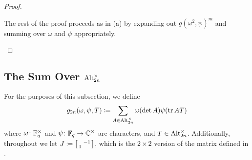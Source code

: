 \begin{proof}
\begin{enumerate}[label=(\alph*)]
        The rest of the proof proceeds as in (a) by expanding out $g\left(\omega^2,\psi\right)^m$ and summing over $\omega$ and $\psi$ appropriately.
        \qedhere
    \end{enumerate}
\end{proof}

\subsection{The Sum Over \texorpdfstring{$\operatorname{Alt}_{2n}^\times$}{ Alt}}
For the purposes of this subsection, we define
\[g_{2n}(\omega,\psi,T)\coloneqq\sum_{A\in\operatorname{Alt}_{2n}^\times}\omega(\det A)\psi(\operatorname{tr} AT)\]
where $\omega\colon\mathbb F_q^\times$ and $\psi\colon\mathbb F_q\to\mathbb C^\times$ are characters, and $T\in\operatorname{Alt}_{2n}^\times$. Additionally, throughout we let $J\coloneqq\begin{bsmallmatrix}
    & -1 \\ 1
\end{bsmallmatrix}$, which is the $2\times2$ version of the matrix defined in .

